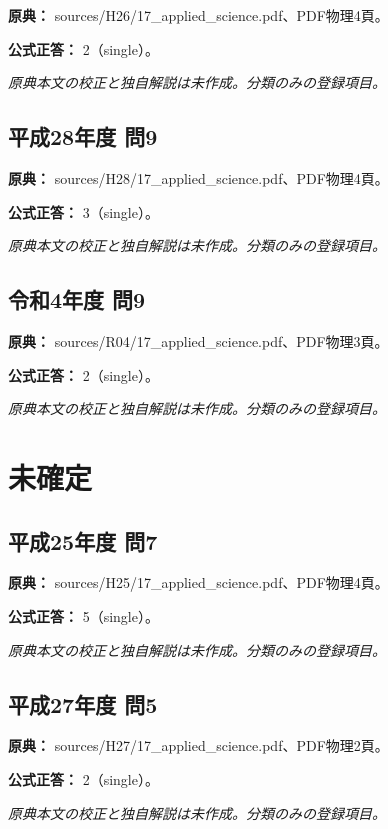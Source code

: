 \noindent\textbf{原典：} sources/H26/17\_applied\_science.pdf、PDF物理4頁。

\textbf{公式正答：} 2（single）。

\par\textit{原典本文の校正と独自解説は未作成。分類のみの登録項目。}

\subsection{平成28年度 問9}
\label{q:h28-reg-applied-09}

\noindent\textbf{原典：} sources/H28/17\_applied\_science.pdf、PDF物理4頁。

\textbf{公式正答：} 3（single）。

\par\textit{原典本文の校正と独自解説は未作成。分類のみの登録項目。}

\subsection{令和4年度 問9}
\label{q:r04-reg-applied-09}

\noindent\textbf{原典：} sources/R04/17\_applied\_science.pdf、PDF物理3頁。

\textbf{公式正答：} 2（single）。

\par\textit{原典本文の校正と独自解説は未作成。分類のみの登録項目。}

\section{未確定}

\subsection{平成25年度 問7}
\label{q:h25-reg-applied-07}

\noindent\textbf{原典：} sources/H25/17\_applied\_science.pdf、PDF物理4頁。

\textbf{公式正答：} 5（single）。

\par\textit{原典本文の校正と独自解説は未作成。分類のみの登録項目。}

\subsection{平成27年度 問5}
\label{q:h27-reg-applied-05}

\noindent\textbf{原典：} sources/H27/17\_applied\_science.pdf、PDF物理2頁。

\textbf{公式正答：} 2（single）。

\par\textit{原典本文の校正と独自解説は未作成。分類のみの登録項目。}
